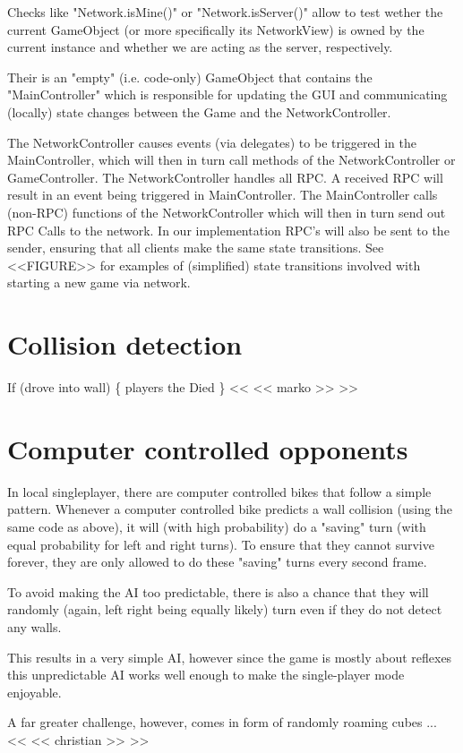 \documentclass{report}
\begin{document}
Checks like "Network.isMine()" or "Network.isServer()" allow to test wether the current GameObject (or more specifically its NetworkView) is owned by the current instance and whether we are acting as the server, respectively. 

Their is an "empty" (i.e. code-only) GameObject that contains the "MainController" which is responsible for updating the GUI and communicating (locally) state changes between the Game and the NetworkController.

The NetworkController causes events (via delegates) to be triggered in the MainController, which will then in turn call methods of the NetworkController or GameController.
The NetworkController handles all RPC. A received RPC will result in an event being triggered in MainController.
The MainController calls (non-RPC) functions of the NetworkController which will then in turn send out RPC Calls  to the network.
In our implementation RPC's will also be sent to the sender, ensuring that all clients make the same state transitions.
See <<FIGURE>> for examples of (simplified) state transitions involved with starting a new game via network.


\section{Collision detection}
If (drove into wall) \{
	players the Died 
	\}
	<< << marko >> >>

\section{Computer controlled opponents}
In local singleplayer, there are computer controlled bikes that follow a simple pattern. 
Whenever a computer controlled bike predicts a wall collision (using the same code as above), it will (with high probability) do a "saving" turn (with equal probability for left and right turns). To ensure that they cannot survive forever, they are only allowed to do these "saving" turns every second frame.

To avoid making the AI too predictable, there is also a chance that they will randomly (again, left right being equally likely) turn even if they do not detect any walls.

This results in a very simple AI, however since the game is mostly about reflexes this unpredictable AI works well enough to make the single-player mode enjoyable.

A far greater challenge, however, comes in form of randomly roaming cubes ...
 << << christian >> >>
\end{document}
